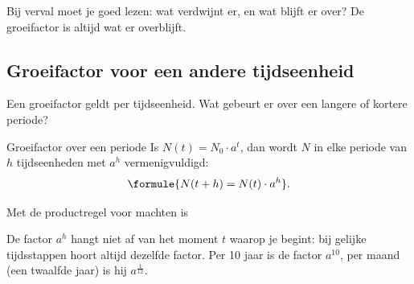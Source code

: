 \begin{oefeningen}
\end{oefeningen}

Bij verval moet je goed lezen: wat verdwijnt er, en wat blijft er over? De groeifactor is altijd wat er overblijft.


\begin{oefeningen}
\end{oefeningen}

\subsection{Groeifactor voor een andere tijdseenheid}

Een groeifactor geldt per tijdseenheid. Wat gebeurt er over een langere of kortere periode?

\begin{theorie}
\begin{stelling}{Groeifactor over een periode}
Is $N(t) = N_0 \cdot a^t$, dan wordt $N$ in elke periode van $h$ tijdseenheden met $a^h$ vermenigvuldigd:
\[\formule{N(t + h) = N(t) \cdot a^h}.\]
\end{stelling}
\begin{bewijs}
Met de productregel voor machten is
\end{bewijs}
\end{theorie}

De factor $a^h$ hangt niet af van het moment $t$ waarop je begint: bij gelijke tijdsstappen hoort altijd dezelfde factor. Per 10 jaar is de factor $a^{10}$, per maand (een twaalfde jaar) is hij $a^{\frac{1}{12}}$.

